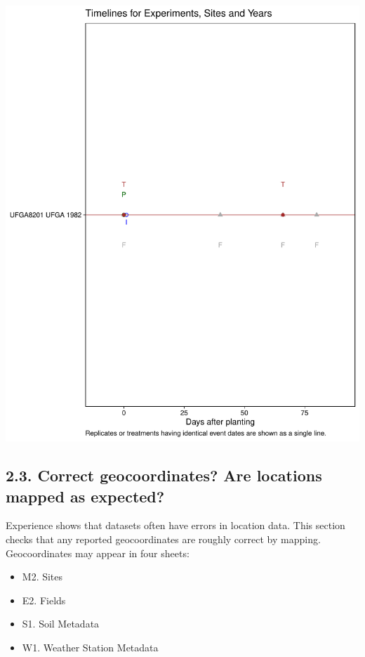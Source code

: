 \documentclass[
]{article}
\providecommand{\tightlist}{%
  \setlength{\itemsep}{0pt}\setlength{\parskip}{0pt}}
\begin{document}
\includegraphics{FL_Crop_BMP_QA_single_dataset_files/figure-latex/check-dates-1.pdf}

\newpage

\subsection{2.3. Correct geocoordinates? Are locations mapped as
expected?}\label{correct-geocoordinates-are-locations-mapped-as-expected}

Experience shows that datasets often have errors in location data. This
section checks that any reported geocoordinates are roughly correct by
mapping. Geocoordinates may appear in four sheets:

\begin{itemize}
\tightlist
\item
  M2. Sites
\item
  E2. Fields
\item
  S1. Soil Metadata
\item
  W1. Weather Station Metadata
\end{itemize}
\end{document}
